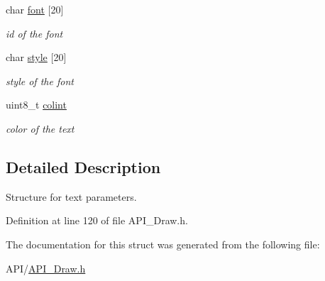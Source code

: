 \begin{DoxyCompactItemize}
\mbox{\label{struct_t_e_x_t_a333e02dd657fb6d02f928075a9ed9119}} 
char \hyperlink{struct_t_e_x_t_a333e02dd657fb6d02f928075a9ed9119}{font} \mbox{[}20\mbox{]}
\begin{DoxyCompactList}\small\item\em id of the font \end{DoxyCompactList}\item 
\mbox{\label{struct_t_e_x_t_a34df1ac1fb51661ced6c422e491bf638}} 
char \hyperlink{struct_t_e_x_t_a34df1ac1fb51661ced6c422e491bf638}{style} \mbox{[}20\mbox{]}
\begin{DoxyCompactList}\small\item\em style of the font \end{DoxyCompactList}\item 
\mbox{\label{struct_t_e_x_t_a21caa4b27a71b7967f1a2d64f196a674}} 
uint8\+\_\+t \hyperlink{struct_t_e_x_t_a21caa4b27a71b7967f1a2d64f196a674}{colint}
\begin{DoxyCompactList}\small\item\em color of the text \end{DoxyCompactList}\end{DoxyCompactItemize}


\subsection{Detailed Description}
Structure for text parameters. 

Definition at line 120 of file A\+P\+I\+\_\+\+Draw.\+h.



The documentation for this struct was generated from the following file\+:\begin{DoxyCompactItemize}
\item 
A\+P\+I/\hyperlink{_a_p_i___draw_8h}{A\+P\+I\+\_\+\+Draw.\+h}\end{DoxyCompactItemize}
